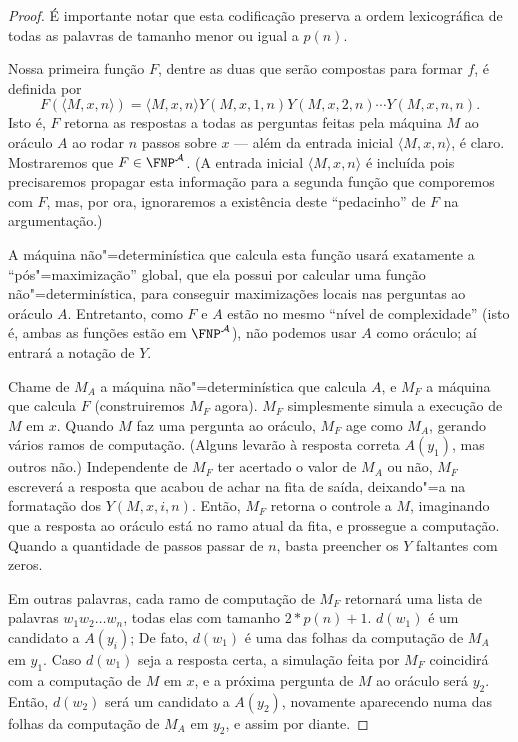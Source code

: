 \begin{proof}
    É importante notar que esta codificação
    preserva a ordem lexicográfica de todas as palavras
    de tamanho menor ou igual a $p(n)$.

    Nossa primeira função $F$,
    dentre as duas que serão compostas para formar $f$,
    é definida por
    \begin{equation*}
        F(\langle M, x, n \rangle) = \langle M, x, n \rangle
            Y(M, x, 1, n) Y(M, x, 2, n) \cdots Y(M, x, n, n).
    \end{equation*}
    Isto é,
    $F$ retorna as respostas a todas as perguntas feitas pela máquina $M$ ao oráculo $A$
    ao rodar $n$ passos sobre $x$
    --- além da entrada inicial $\langle M, x, n \rangle$, é claro.
    Mostraremos que $F \in \FNP^\mathcal A$.
    (A entrada inicial $\langle M, x, n \rangle$
    é incluída pois precisaremos propagar esta informação para a segunda função
    que comporemos com $F$,
    mas, por ora,
    ignoraremos a existência deste ``pedacinho'' de $F$ na argumentação.)

    A máquina não"=determinística que calcula esta função
    usará exatamente a ``pós"=maximização'' global,
    que ela possui por calcular uma função não"=determinística,
    para conseguir maximizações locais nas perguntas ao oráculo $A$.
    Entretanto,
    como $F$ e $A$ estão no mesmo ``nível de complexidade''
    (isto é, ambas as funções estão em $\FNP^\mathcal A$),
    não podemos usar $A$ como oráculo;
    aí entrará a notação de $Y$.

    Chame de $M_A$ a máquina não"=determinística que calcula $A$,
    e $M_F$ a máquina que calcula $F$
    (construiremos $M_F$ agora).
    $M_F$ simplesmente simula a execução de $M$ em $x$.
    Quando $M$ faz uma pergunta ao oráculo,
    $M_F$ age como $M_A$,
    gerando vários ramos de computação.
    (Alguns levarão à resposta correta $A(y_1)$,
    mas outros não.)
    Independente de $M_F$ ter acertado o valor de $M_A$ ou não,
    $M_F$ escreverá a resposta que acabou de achar na fita de saída,
    deixando"=a na formatação dos $Y(M, x, i, n)$.
    Então, $M_F$ retorna o controle a $M$,
    imaginando que a resposta ao oráculo está no ramo atual da fita,
    e prossegue a computação.
    Quando a quantidade de passos passar de $n$,
    basta preencher os $Y$ faltantes com zeros.

    Em outras palavras,
    cada ramo de computação de $M_F$
    retornará uma lista de palavras $w_1 w_2 \dots w_n$,
    todas elas com tamanho $2*p(n)+1$.
    $d(w_1)$ é um candidato a $A(y_i)$;
    De fato, $d(w_1)$ é uma das folhas da computação de $M_A$ em $y_1$.
    Caso $d(w_1)$ seja a resposta certa,
    a simulação feita por $M_F$
    coincidirá com a computação de $M$ em $x$,
    e a próxima pergunta de $M$ ao oráculo será $y_2$.
    Então, $d(w_2)$ será um candidato a $A(y_2)$,
    novamente aparecendo numa das folhas da computação de $M_A$ em $y_2$,
    e assim por diante.


\end{proof}
